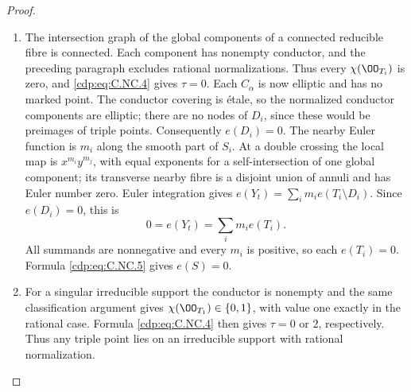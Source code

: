 \begin{proof}
\begin{enumerate}[label=\arabic*.,leftmargin=*]
\item The intersection graph of the global components of a connected reducible fibre is connected. Each component has nonempty conductor, and the preceding paragraph excludes rational normalizations. Thus every $\chi(\OO_{T_i})$ is zero, and \eqref{cdp:eq:C.NC.4} gives $\tau=0$. Each $C_\alpha$ is now elliptic and has no marked point. The conductor covering is étale, so the normalized conductor components are elliptic; there are no nodes of $D_i$, since these would be preimages of triple points. Consequently $e(D_i)=0$. The nearby Euler function is $m_i$ along the smooth part of $S_i$. At a double crossing the local map is $x^{m_i}y^{m_j}$, with equal exponents for a self-intersection of one global component; its transverse nearby fibre is a disjoint union of annuli and has Euler number zero. Euler integration gives $e(Y_t)=\sum_i m_i e(T_i\setminus D_i)$. Since $e(D_i)=0$, this is
\[
 0=e(Y_t)=\sum_i m_i e(T_i).
\]
All summands are nonnegative and every $m_i$ is positive, so each $e(T_i)=0$. Formula \eqref{cdp:eq:C.NC.5} gives $e(S)=0$.

\item For a singular irreducible support the conductor is nonempty and the same classification argument gives $\chi(\OO_{T_1})\in\{0,1\}$, with value one exactly in the rational case. Formula \eqref{cdp:eq:C.NC.4} then gives $\tau=0$ or $2$, respectively. Thus any triple point lies on an irreducible support with rational normalization.

\end{enumerate}
\end{proof}